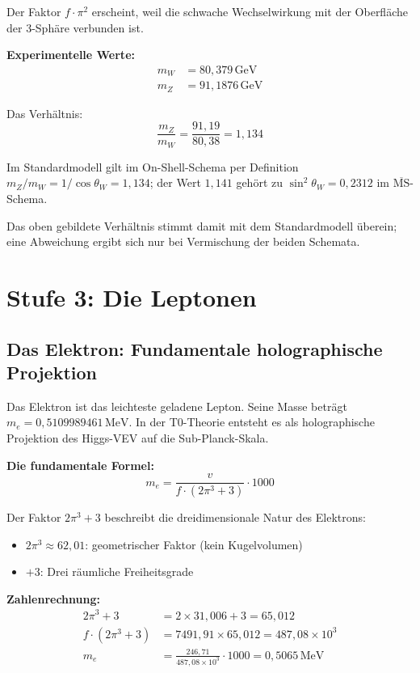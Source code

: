 	Der Faktor \(f \cdot \pi^2\) erscheint, weil die schwache Wechselwirkung mit der Oberfläche der 3-Sphäre verbunden ist.
	
	\textbf{Experimentelle Werte:}
	\begin{align}
		m_W &= 80{,}379\,\text{GeV} \\
		m_Z &= 91{,}1876\,\text{GeV}
	\end{align}
	
	Das Verhältnis:
	\begin{equation}
		\frac{m_Z}{m_W} = \frac{91{,}19}{80{,}38} = 1{,}134
	\end{equation}
	
	Im Standardmodell gilt im On-Shell-Schema per Definition \(m_Z/m_W = 1/\cos\theta_W = 1{,}134\); der Wert \(1{,}141\) gehört zu \(\sin^2\theta_W = 0{,}2312\) im \(\overline{\text{MS}}\)-Schema.
	
	Das oben gebildete Verhältnis stimmt damit mit dem Standardmodell überein; eine Abweichung ergibt sich nur bei Vermischung der beiden Schemata.
	
	\section{Stufe 3: Die Leptonen}
	
	\subsection{Das Elektron: Fundamentale holographische Projektion}
	
	Das Elektron ist das leichteste geladene Lepton. Seine Masse beträgt \(m_e = 0{,}5109989461\,\text{MeV}\). In der T0-Theorie entsteht es als holographische Projektion des Higgs-VEV auf die Sub-Planck-Skala.
	
	\textbf{Die fundamentale Formel:}
	\begin{equation}
		\boxed{m_e = \frac{v}{f \cdot (2\pi^3 + 3)} \cdot 1000}
	\end{equation}
	
	Der Faktor \(2\pi^3 + 3\) beschreibt die dreidimensionale Natur des Elektrons:
	\begin{itemize}
		\item \(2\pi^3 \approx 62{,}01\): geometrischer Faktor (kein Kugelvolumen)
		\item \(+3\): Drei räumliche Freiheitsgrade
	\end{itemize}
	
	\textbf{Zahlenrechnung:}
	\begin{align}
		2\pi^3 + 3 &= 2 \times 31{,}006 + 3 = 65{,}012 \\
		f \cdot (2\pi^3 + 3) &= 7491{,}91 \times 65{,}012 = 487{,}08 \times 10^{3} \\
		m_e &= \frac{246{,}71}{487{,}08 \times 10^{3}} \cdot 1000 = 0{,}5065\,\text{MeV}
	\end{align}
	
